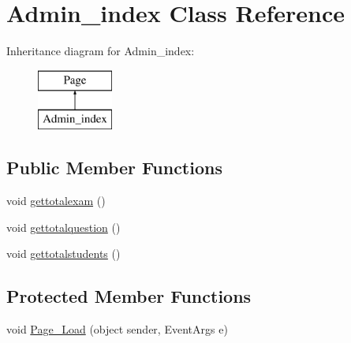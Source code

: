 \hypertarget{class_admin__index}{}\section{Admin\+\_\+index Class Reference}
\label{class_admin__index}
Inheritance diagram for Admin\+\_\+index\+:\begin{figure}[H]
\begin{center}
\leavevmode
\includegraphics[height=2.000000cm]{class_admin__index}
\end{center}
\end{figure}
\subsection*{Public Member Functions}
\begin{DoxyCompactItemize}
\item 
void \mbox{\hyperlink{class_admin__index_a67f8a52d941c73c8e9b62440448ad50e}{gettotalexam}} ()
\item 
void \mbox{\hyperlink{class_admin__index_a9a8042e0ec3fdfdcafccad1842ce2883}{gettotalquestion}} ()
\item 
void \mbox{\hyperlink{class_admin__index_ae4c2b6bf652cc82a355e016e84cc30c1}{gettotalstudents}} ()
\end{DoxyCompactItemize}
\subsection*{Protected Member Functions}
\begin{DoxyCompactItemize}
\item 
void \mbox{\hyperlink{class_admin__index_aa9cb32eec5d182797e2a8e232a59c935}{Page\+\_\+\+Load}} (object sender, Event\+Args e)
\end{DoxyCompactItemize}
